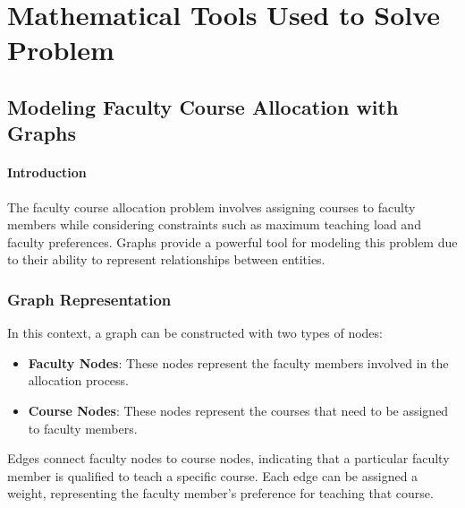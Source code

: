 \documentclass{article}
\begin{document}
\section{Mathematical Tools Used to Solve Problem}
\subsection{Modeling Faculty Course Allocation with Graphs}
\paragraph{Introduction}
The faculty course allocation problem involves assigning courses to faculty members while considering constraints such as maximum teaching load and faculty preferences. Graphs provide a powerful tool for modeling this problem due to their ability to represent relationships between entities.

\subsubsection{Graph Representation}
In this context, a graph can be constructed with two types of nodes:
\begin{itemize}
  \item \textbf{Faculty Nodes}: These nodes represent the faculty members involved in the allocation process.
  \item \textbf{Course Nodes}: These nodes represent the courses that need to be assigned to faculty members.
\end{itemize}
Edges connect faculty nodes to course nodes, indicating that a particular faculty member is qualified to teach a specific course. Each edge can be assigned a weight, representing the faculty member's preference for teaching that course.
\newline
{}
\end{document}
